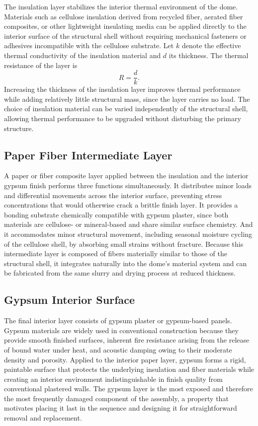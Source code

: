 \documentclass[12pt,a4paper]{article}
\begin{document}
The insulation layer stabilizes the interior thermal environment of the
dome. Materials such as cellulose insulation derived from recycled fiber,
aerated fiber composites, or other lightweight insulating media can be
applied directly to the interior surface of the structural shell without
requiring mechanical fasteners or adhesives incompatible with the
cellulose substrate. Let $k$ denote the effective thermal conductivity
of the insulation material and $d$ its thickness. The thermal resistance
of the layer is
\begin{equation}
R = \frac{d}{k}.
\end{equation}
Increasing the thickness of the insulation layer improves thermal
performance while adding relatively little structural mass, since the
layer carries no load. The choice of insulation material can be varied
independently of the structural shell, allowing thermal performance to
be upgraded without disturbing the primary structure.

\subsection{Paper Fiber Intermediate Layer}

A paper or fiber composite layer applied between the insulation and the
interior gypsum finish performs three functions simultaneously. It
distributes minor loads and differential movements across the interior
surface, preventing stress concentrations that would otherwise crack a
brittle finish layer. It provides a bonding substrate chemically
compatible with gypsum plaster, since both materials are cellulose- or
mineral-based and share similar surface chemistry. And it accommodates
minor structural movement, including seasonal moisture cycling of the
cellulose shell, by absorbing small strains without fracture. Because
this intermediate layer is composed of fibers materially similar to
those of the structural shell, it integrates naturally into the dome's
material system and can be fabricated from the same slurry and drying
process at reduced thickness.

\subsection{Gypsum Interior Surface}

The final interior layer consists of gypsum plaster or gypsum-based
panels. Gypsum materials are widely used in conventional construction
because they provide smooth finished surfaces, inherent fire resistance
arising from the release of bound water under heat, and acoustic
damping owing to their moderate density and porosity. Applied to the
interior paper layer, gypsum forms a rigid, paintable surface that
protects the underlying insulation and fiber materials while creating
an interior environment indistinguishable in finish quality from
conventional plastered walls. The gypsum layer is the most exposed and
therefore the most frequently damaged component of the assembly, a
property that motivates placing it last in the sequence and designing
it for straightforward removal and replacement.
\end{document}
